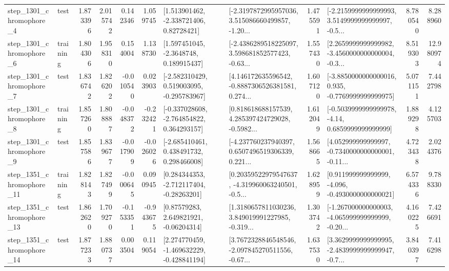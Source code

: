 \begin{tabular}{llrrrrllrlrr}
  step\_1301\_chromophore\_4 &      test &      1.873396 &    2.015742 &      0.142346 &  1.059745 &     [1.513901462, -2.338721406, 0.82728421] &  [-2.3197872995957036, 3.515086660499857, -1.20... &       1.475591 &  [-2.2159999999999993, 3.5149999999999997, -0.5... &            8.780540 &          8.288960 \\
  step\_1301\_chromophore\_6 &  training &      1.804306 &    1.958310 &      0.154004 &  1.138730 &      [1.597451045, -2.3648748, 0.189915437] &  [-2.4386289518225097, 3.598681852577423, -0.63... &       1.557430 &  [2.2659999999999982, -3.4560000000000004, -0.3... &            8.519303 &         12.980974 \\
  step\_1301\_chromophore\_7 &      test &      1.836742 &    1.826202 &     -0.010540 &  0.023903 &   [-2.582310429, 0.519003095, -0.295783967] &  [4.146172635596542, -0.8887306526381581, 0.274... &       1.607120 &  [-3.8850000000000016, 0.935, -0.7769999999999975] &            5.071151 &          7.442798 \\
  step\_1301\_chromophore\_8 &  training &      1.857260 &    1.808887 &     -0.048372 & -0.232421 &   [-0.337028608, -2.764854822, 0.364293157] &  [0.818618688157539, 4.285397424729028, -0.5982... &       1.612049 &   [-0.5039999999999978, -4.14, 0.6859999999999999] &            1.889298 &          4.125703 \\
  step\_1301\_chromophore\_9 &      test &      1.857586 &    1.839677 &     -0.017909 & -0.026026 &    [-2.685410461, 0.438491732, 0.298466008] &  [-4.237760237940397, 0.6507496519306339, 0.221... &       1.568665 &  [4.052999999999997, -0.7340000000000001, -0.11... &            4.723438 &          2.024376 \\
 step\_1351\_chromophore\_11 &  training &      1.828143 &    1.827499 &     -0.000645 &  0.090945 &    [0.284344353, -2.712117404, -0.28263201] &  [0.20359522979547637, -4.319960063240501, -0.5... &       1.628959 &   [0.911999999999999, -4.096, -0.4930000000000021] &            6.574336 &          9.788330 \\
 step\_1351\_chromophore\_13 &      test &      1.862620 &    1.709270 &     -0.153351 & -0.943675 &      [0.87579283, 2.649821921, -0.06204314] &  [1.3180657811030236, 3.849019991227985, -0.319... &       1.303742 &  [-1.267000000000003, -4.065999999999999, -0.20... &            4.160225 &          7.426691 \\
 step\_1351\_chromophore\_14 &      test &      1.877233 &    1.880737 &      0.003504 &  0.119054 &   [2.274770459, -1.469632229, -0.428841194] &  [3.7672328846548546, -2.097845270511556, -0.67... &       1.637530 &  [3.3629999999999995, -2.4839999999999947, -0.7... &            3.840397 &          7.416298 \\

\end{tabular}
